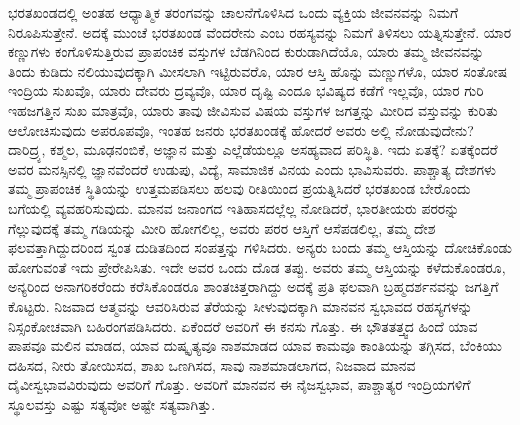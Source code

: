 ಭರತಖಂಡದಲ್ಲಿ ಅಂತಹ ಆಧ್ಯಾತ್ಮಿಕ ತರಂಗವನ್ನು ಚಾಲನೆಗೊಳಿಸಿದ ಒಂದು ವ್ಯಕ್ತಿಯ ಜೀವನವನ್ನು ನಿಮಗೆ ನಿರೂಪಿಸುತ್ತೇನೆ. ಅದಕ್ಕೆ ಮುಂಚೆ ಭರತಖಂಡ ವೆಂದರೇನು ಎಂಬ ರಹಸ್ಯವನ್ನು ನಿಮಗೆ ತಿಳಿಸಲು ಯತ್ನಿಸುತ್ತೇನೆ. ಯಾರ ಕಣ್ಣುಗಳು ಕಂಗೊಳಿಸುತ್ತಿರುವ ಪ್ರಾಪಂಚಿಕ ವಸ್ತುಗಳ ಬೆಡಗಿನಿಂದ ಕುರುಡಾಗಿದೆಯೊ, ಯಾರು ತಮ್ಮ ಜೀವನವನ್ನು ತಿಂದು ಕುಡಿದು ನಲಿಯುವುದಕ್ಕಾಗಿ ಮೀಸಲಾಗಿ ಇಟ್ಟಿರುವರೊ, ಯಾರ ಆಸ್ತಿ ಹೊನ್ನು ಮಣ್ಣುಗಳೊ, ಯಾರ ಸಂತೋಷ ಇಂದ್ರಿಯ ಸುಖವೊ, ಯಾರು ದೇವರು ದ್ರವ್ಯವೊ, ಯಾರ ದೃಷ್ಟಿ ಎಂದೂ ಭವಿಷ್ಯದ ಕಡೆಗೆ ಇಲ್ಲವೊ, ಯಾರ ಗುರಿ ಇಹಜಗತ್ತಿನ ಸುಖ ಮಾತ್ರವೊ, ಯಾರು ತಾವು ಜೀವಿಸುವ ವಿಷಯ ವಸ್ತುಗಳ ಜಗತ್ತನ್ನು ಮೀರಿದ ವಸ್ತುವನ್ನು ಕುರಿತು ಆಲೋಚಿಸುವುದು ಅಪರೂಪವೊ, ಇಂತಹ ಜನರು ಭರತಖಂಡಕ್ಕೆ ಹೋದರೆ ಅವರು ಅಲ್ಲಿ ನೋಡುವುದೇನು? ದಾರಿದ್ರ್ಯ, ಕಶ್ಮಲ, ಮೂಢನಂಬಿಕೆ, ಅಜ್ಞಾನ ಮತ್ತು ಎಲ್ಲೆಡೆಯಲ್ಲೂ ಅಸಹ್ಯವಾದ ಪರಿಸ್ಥಿತಿ. ಇದು ಏತಕ್ಕೆ? ಏತಕ್ಕೆಂದರೆ ಅವರ ಮನಸ್ಸಿನಲ್ಲಿ ಜ್ಞಾನವೆಂದರೆ ಉಡುಪು, ವಿದ್ಯೆ, ಸಾಮಾಜಿಕ ವಿನಯ ಎಂದು ಭಾವಿಸುವರು. ಪಾಶ್ಚಾತ್ಯ ದೇಶಗಳು ತಮ್ಮ ಪ್ರಾಪಂಚಿಕ ಸ್ಥಿತಿಯನ್ನು ಉತ್ತಮಪಡಿಸಲು ಹಲವು ರೀತಿಯಿಂದ ಪ್ರಯತ್ನಿಸಿದರೆ ಭರತಖಂಡ ಬೇರೊಂದು ಬಗೆಯಲ್ಲಿ ವ್ಯವಹರಿಸುವುದು. ಮಾನವ ಜನಾಂಗದ ಇತಿಹಾಸದಲ್ಲೆಲ್ಲ ನೋಡಿದರೆ, ಭಾರತೀಯರು ಪರರನ್ನು ಗೆಲ್ಲುವುದಕ್ಕೆ ತಮ್ಮ ಗಡಿಯನ್ನು ಮೀರಿ ಹೋಗಲಿಲ್ಲ, ಅವರು ಪರರ ಆಸ್ತಿಗೆ ಆಸೆಪಡಲಿಲ್ಲ, ತಮ್ಮ ದೇಶ ಫಲವತ್ತಾಗಿದ್ದುದರಿಂದ ಸ್ವಂತ ದುಡಿತದಿಂದ ಸಂಪತ್ತನ್ನು ಗಳಿಸಿದರು. ಅನ್ಯರು ಬಂದು ತಮ್ಮ ಆಸ್ತಿಯನ್ನು ದೋಚಿಕೊಂಡು ಹೋಗುವಂತೆ ಇದು ಪ್ರೇರೇಪಿಸಿತು. ಇದೇ ಅವರ ಒಂದು ದೊಡ ತಪ್ಪು. ಅವರು ತಮ್ಮ ಆಸ್ತಿಯನ್ನು ಕಳೆದುಕೊಂಡರೂ, ಅನ್ಯರಿಂದ ಅನಾಗರಿಕರೆಂದು ಕರೆಸಿಕೊಂಡರೂ ಶಾಂತಚಿತ್ತರಾಗಿದ್ದು ಅದಕ್ಕೆ ಪ್ರತಿ ಫಲವಾಗಿ ಬ್ರಹ್ಮದರ್ಶನವನ್ನು ಜಗತ್ತಿಗೆ ಕೊಟ್ಟರು. ನಿಜವಾದ ಆತ್ಮವನ್ನು ಆವರಿಸಿರುವ ತೆರೆಯನ್ನು ಸೀಳುವುದಕ್ಕಾಗಿ ಮಾನವನ ಸ್ವಭಾವದ ರಹಸ್ಯಗಳನ್ನು ನಿಸ್ಸಂಕೋಚವಾಗಿ ಬಹಿರಂಗಪಡಿಸಿದರು. ಏಕೆಂದರೆ ಅವರಿಗೆ ಈ ಕನಸು ಗೊತ್ತು. ಈ ಭೌತತತ್ತ್ವದ ಹಿಂದೆ ಯಾವ ಪಾಪವೂ ಮಲಿನ ಮಾಡದ, ಯಾವ ದುಷ್ಕೃತ್ಯವೂ ನಾಶಮಾಡದ ಯಾವ ಕಾಮವೂ ಕಾಂತಿಯನ್ನು ತಗ್ಗಿಸದ, ಬೆಂಕಿಯು ದಹಿಸದ, ನೀರು ತೋಯಿಸದ, ಶಾಖ ಒಣಗಿಸದ, ಸಾವು ನಾಶಮಾಡಲಾಗದ, ನಿಜವಾದ ಮಾನವ ದೈವೀಸ್ವಭಾವವಿರುವುದು ಅವರಿಗೆ ಗೊತ್ತು. ಅವರಿಗೆ ಮಾನವನ ಈ ನೈಜಸ್ವಭಾವ, ಪಾಶ್ಚಾತ್ಯರ ಇಂದ್ರಿಯಗಳಿಗೆ ಸ್ಥೂಲವಸ್ತು ಎಷ್ಟು ಸತ್ಯವೋ ಅಷ್ಟೇ ಸತ್ಯವಾಗಿತ್ತು.

